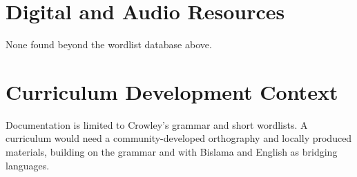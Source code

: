 \documentclass[12pt]{article}
\begin{document}
\section{Digital and Audio Resources}
None found beyond the wordlist database above.

\section{Curriculum Development Context}
Documentation is limited to Crowley's grammar and short wordlists. A curriculum would need a community-developed orthography and locally produced materials, building on the grammar and with Bislama and English as bridging languages.
\end{document}
